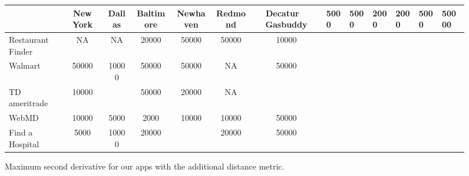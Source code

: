 \begin{figure}
 \centering
 \begin{tabular}{|l||c|c|c|c|c|c|}
 \hline
 & New York & Dallas & Baltimore & Newhaven & Redmond & Decatur \
 \hline
 \hline
 Gasbuddy & 5000 & 5000 & 2000 & 2000 & 5000 & 50000 \\
\hline
Restaurant Finder & NA & NA & 20000 & 50000 & 50000 & 10000 \\
\hline
Walmart & 50000 & 10000 & 50000 & 50000 & NA & 50000 \\
\hline
TD ameritrade & 10000 &  & 50000 & 20000 & NA &  \\
\hline
WebMD & 10000 & 5000 & 2000 & 10000 & 10000 & 50000 \\
\hline
Find a Hospital & 5000 & 10000 & 20000 &  & 20000 & 50000 \\
\hline

\end{tabular}
 \caption{Maximum second derivative for our apps with the additional distance metric.}
 \label{fig:knee-points-{knees[0][3].split[0].downcase}}
\end{figure}
